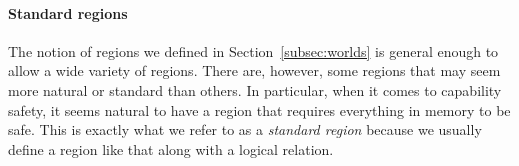 \begin{jversion}

\paragraph{Standard regions}
\label{par:standard-regions}
The notion of regions we defined in Section~\ref{subsec:worlds} is general enough to allow a wide variety of regions.
There are, however, some regions that may seem more natural or standard than others.
In particular, when it comes to capability safety, it seems natural to have a region that requires everything in memory to be safe.
This is exactly what we refer to as a \emph{standard region} because we usually define a region like that along with a logical relation. 


\end{jversion}
